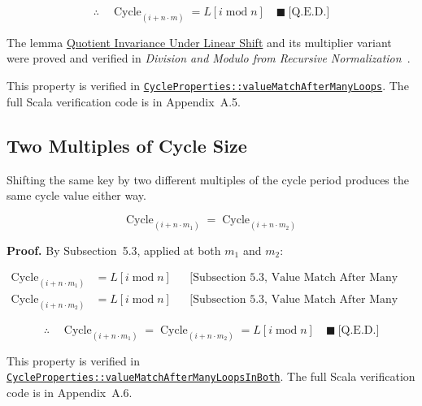 \begin{equation*}
\therefore\quad \operatorname{Cycle}_{(i+n\cdot m)}=L[i\operatorname{mod}n]
  \quad \blacksquare\ \text{[Q.E.D.]}
\end{equation*}

The lemma
\href{https://github.com/thiagomata/prime-numbers/blob/cycle-article-v1.0.0/articles/chapter2/modulo.md#65-quotient-invariance-under-linear-shift}{Quotient Invariance Under Linear Shift}
and its multiplier variant were proved and verified in
\emph{Division and Modulo from Recursive Normalization}~\cite{mata2026modulo}.

This property is verified in
\href{https://github.com/thiagomata/prime-numbers/blob/cycle-article-v1.0.0/src/main/scala/v1/chapter4/cycle/properties/CycleProperties.scala}{\texttt{CycleProperties::valueMatchAfterManyLoops}}.
The full Scala verification code is in Appendix~A.5.

\subsection{Two Multiples of Cycle Size}

Shifting the same key by two different multiples of the cycle period produces
the same cycle value either way.

\begin{equation*}
\operatorname{Cycle}_{(i+n\cdot m_1)}
  =\operatorname{Cycle}_{(i+n\cdot m_2)}
\end{equation*}

\noindent\textbf{Proof.} By Subsection~5.3, applied at both $m_1$ and $m_2$:

\begin{equation*}
\begin{aligned}
\operatorname{Cycle}_{(i+n\cdot m_1)}
  &=L[i\operatorname{mod}n]
  && \text{[Subsection 5.3, Value Match After Many Loops]} \\
\operatorname{Cycle}_{(i+n\cdot m_2)}
  &=L[i\operatorname{mod}n]
  && \text{[Subsection 5.3, Value Match After Many Loops]}
\end{aligned}
\end{equation*}

\begin{equation*}
\therefore\quad
\operatorname{Cycle}_{(i+n\cdot m_1)}
  =\operatorname{Cycle}_{(i+n\cdot m_2)}
  =L[i\operatorname{mod}n]
  \quad \blacksquare\ \text{[Q.E.D.]}
\end{equation*}

This property is verified in
\href{https://github.com/thiagomata/prime-numbers/blob/cycle-article-v1.0.0/src/main/scala/v1/chapter4/cycle/properties/CycleProperties.scala}{\texttt{CycleProperties::valueMatchAfterManyLoopsInBoth}}.
The full Scala verification code is in Appendix~A.6.


